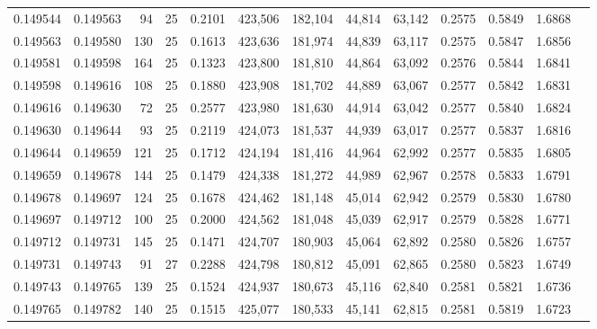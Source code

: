 \begin{tabular}{rrrrrrrrrrrrr}
0.149544 & 0.149563 &    94 &  25 &                                     0.2101 & 423,506 & 182,104 &  44,814 &  63,142 & 0.2575 & 0.5849 & 1.6868 \\
0.149563 & 0.149580 &   130 &  25 &                                     0.1613 & 423,636 & 181,974 &  44,839 &  63,117 & 0.2575 & 0.5847 & 1.6856 \\
0.149581 & 0.149598 &   164 &  25 &                                     0.1323 & 423,800 & 181,810 &  44,864 &  63,092 & 0.2576 & 0.5844 & 1.6841 \\
0.149598 & 0.149616 &   108 &  25 &                                     0.1880 & 423,908 & 181,702 &  44,889 &  63,067 & 0.2577 & 0.5842 & 1.6831 \\
0.149616 & 0.149630 &    72 &  25 &                                     0.2577 & 423,980 & 181,630 &  44,914 &  63,042 & 0.2577 & 0.5840 & 1.6824 \\
0.149630 & 0.149644 &    93 &  25 &                                     0.2119 & 424,073 & 181,537 &  44,939 &  63,017 & 0.2577 & 0.5837 & 1.6816 \\
0.149644 & 0.149659 &   121 &  25 &                                     0.1712 & 424,194 & 181,416 &  44,964 &  62,992 & 0.2577 & 0.5835 & 1.6805 \\
0.149659 & 0.149678 &   144 &  25 &                                     0.1479 & 424,338 & 181,272 &  44,989 &  62,967 & 0.2578 & 0.5833 & 1.6791 \\
0.149678 & 0.149697 &   124 &  25 &                                     0.1678 & 424,462 & 181,148 &  45,014 &  62,942 & 0.2579 & 0.5830 & 1.6780 \\
0.149697 & 0.149712 &   100 &  25 &                                     0.2000 & 424,562 & 181,048 &  45,039 &  62,917 & 0.2579 & 0.5828 & 1.6771 \\
0.149712 & 0.149731 &   145 &  25 &                                     0.1471 & 424,707 & 180,903 &  45,064 &  62,892 & 0.2580 & 0.5826 & 1.6757 \\
0.149731 & 0.149743 &    91 &  27 &                                     0.2288 & 424,798 & 180,812 &  45,091 &  62,865 & 0.2580 & 0.5823 & 1.6749 \\
0.149743 & 0.149765 &   139 &  25 &                                     0.1524 & 424,937 & 180,673 &  45,116 &  62,840 & 0.2581 & 0.5821 & 1.6736 \\
0.149765 & 0.149782 &   140 &  25 &                                     0.1515 & 425,077 & 180,533 &  45,141 &  62,815 & 0.2581 & 0.5819 & 1.6723 \\

\end{tabular}
